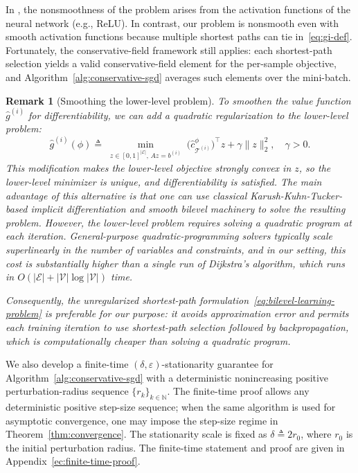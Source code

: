 \documentclass[11pt, letterpaper, oneside, reqno]{amsart}
\newcommand{\Let}{\triangleq}
\newtheorem{remark}{Remark}
\begin{document}
In \cite{ref:bolte2021conservative}, the nonsmoothness of the problem arises from the activation functions of the neural network (e.g., ReLU). In contrast, our problem is nonsmooth even with smooth activation functions because multiple shortest paths can tie in~\eqref{eq:gi-def}. Fortunately, the conservative-field framework still applies: each shortest-path selection yields a valid conservative-field element for the per-sample objective, and Algorithm~\ref{alg:conservative-sgd} averages such elements over the mini-batch.

\begin{remark}[Smoothing the lower-level problem]
\label{rem:smoothing}
To smoothen the value function $\hat g^{(i)}$ for differentiability, we can add a quadratic regularization to the lower-level problem:
\[
\hat g^{(i)}(\phi)
\Let
\min_{\substack{z \in [0,1]^{|\mathcal E|},\, A z = b^{(i)}}}
\bigl(\hat c_{\mathcal T^{(i)}}^\phi\bigr)^\top z
+ \gamma \|z\|_2^2,
\quad \gamma > 0.
\]
This modification makes the lower-level objective strongly convex in $z$, so the lower-level minimizer is unique, and differentiability is satisfied. The main advantage of this alternative is that one can use classical Karush-Kuhn-Tucker-based implicit differentiation and smooth bilevel machinery to solve the resulting problem. However, the lower-level problem requires solving a quadratic program at each iteration. General-purpose quadratic-programming solvers typically scale superlinearly in the number of variables and constraints, and in our setting, this cost is substantially higher than a single run of Dijkstra's algorithm, which runs in $O(|\mathcal E| + |\mathcal V|\log|\mathcal V|)$ time.

Consequently, the unregularized shortest-path formulation~\eqref{eq:bilevel-learning-problem} is preferable for our purpose: it avoids approximation error and permits each training iteration to use shortest-path selection followed by backpropagation, which is computationally cheaper than solving a quadratic program.
\end{remark}

We also develop a finite-time $(\delta,\varepsilon)$-stationarity guarantee for Algorithm~\ref{alg:conservative-sgd} with a deterministic nonincreasing positive perturbation-radius sequence $\{r_k\}_{k\in\mathbb N}$.
The finite-time proof allows any deterministic positive step-size sequence; when the same algorithm is used for asymptotic convergence, one may impose the step-size regime in Theorem~\ref{thm:convergence}.
The stationarity scale is fixed as $\delta \Let 2r_0$, where $r_0$ is the initial perturbation radius.
The finite-time statement and proof are given in Appendix~\ref{ec:finite-time-proof}.
\end{document}

